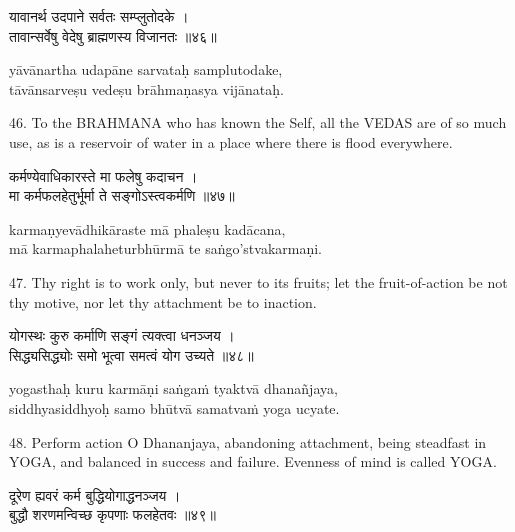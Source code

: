 \begin{gitaverse}
यावानर्थ उदपाने सर्वतः सम्प्लुतोदके । \\
तावान्सर्वेषु वेदेषु ब्राह्मणस्य विजानतः ॥४६॥
\end{gitaverse}

\begin{transliteration}
yāvānartha udapāne sarvataḥ samplutodake, \\
tāvānsarveṣu vedeṣu brāhmaṇasya vijānataḥ.
\end{transliteration}

46. To the BRAHMANA who has known the Self, all the VEDAS are of so much use,
as is a reservoir of water in a place where there is flood everywhere.

\begin{gitaverse}
कर्मण्येवाधिकारस्ते मा फलेषु कदाचन । \\
मा कर्मफलहेतुर्भूर्मा ते सङ्गोऽस्त्वकर्मणि ॥४७॥
\end{gitaverse}

\begin{transliteration}
karmaṇyevādhikāraste mā phaleṣu kadācana, \\
mā karmaphalaheturbhūrmā te saṅgo'stvakarmaṇi.
\end{transliteration}

47. Thy right is to work only, but never to its fruits; let the fruit-of-action
be not thy motive, nor let thy attachment be to inaction.

\begin{gitaverse}
योगस्थः कुरु कर्माणि सङ्गं त्यक्त्वा धनञ्जय । \\
सिद्ध्यसिद्ध्योः समो भूत्वा समत्वं योग उच्यते ॥४८॥
\end{gitaverse}

\begin{transliteration}
yogasthaḥ kuru karmāṇi saṅgaṁ tyaktvā dhanañjaya, \\
siddhyasiddhyoḥ samo bhūtvā samatvaṁ yoga ucyate.
\end{transliteration}

48. Perform action O Dhananjaya, abandoning attachment, being steadfast in
YOGA, and balanced in success and failure. Evenness of mind is called YOGA.\@

\begin{gitaverse}
दूरेण ह्यवरं कर्म बुद्धियोगाद्धनञ्जय । \\
बुद्धौ शरणमन्विच्छ कृपणाः फलहेतवः ॥४९॥
\end{gitaverse}

